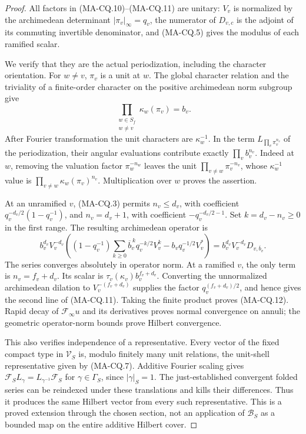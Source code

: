 \begin{proof}
All factors in (MA-CQ.10)--(MA-CQ.11) are unitary:
$V_v$ is normalized by the archimedean determinant
$|\pi_v|_\infty=q_v$, the numerator of $D_{v,c}$
is the adjoint of its commuting invertible
denominator, and (MA-CQ.5) gives the modulus of
each ramified scalar.

We verify that they are the actual periodization,
including the character orientation.
For $w\ne v$, $\pi_v$ is a unit at $w$.
The global character relation and the triviality
of a finite-order character on the positive
archimedean norm subgroup give
\[
                \prod_{\substack{w\in S_f\\w\ne v}}
                              \kappa_w(\pi_v)=b_v .
\tag{MA-CQ.14}
\]
After Fourier transformation the unit characters
are $\kappa_w^{-1}$.
In the term $L_{\prod_v\pi_v^{n_v}}$ of the
periodization, their angular evaluations contribute
exactly $\prod_v b_v^{n_v}$.
Indeed at $w$, removing the valuation factor
$\pi_w^{-n_w}$ leaves the unit
$\prod_{v\ne w}\pi_v^{-n_v}$, whose
$\kappa_w^{-1}$ value is
$\prod_{v\ne w}\kappa_w(\pi_v)^{n_v}$.
Multiplication over $w$ proves the assertion.

At an unramified $v$, (MA-CQ.3) permits
$n_v\le d_v$, with coefficient
$q_v^{-d_v/2}(1-q_v^{-1})$, and $n_v=d_v+1$,
with coefficient $-q_v^{-d_v/2-1}$.
Set $k=d_v-n_v\ge0$ in the first range.
The resulting archimedean operator is
\[
 b_v^{d_v}V_v^{-d_v}
 \left((1-q_v^{-1})
       \sum_{k\ge0}\overline b_v^{\,k}q_v^{-k/2}V_v^k
                   -b_v q_v^{-1/2}V_v^*\right)
       =b_v^{d_v}V_v^{-d_v}D_{v,\overline b_v}.
\tag{MA-CQ.15}
\]
The series converges absolutely in operator norm.
At a ramified $v$, the only term is
$n_v=f_v+d_v$.  Its scalar is
$\tau_v(\kappa_v)b_v^{f_v+d_v}$.
Converting the unnormalized archimedean dilation
to $V_v^{-(f_v+d_v)}$ supplies the factor
$q_v^{(f_v+d_v)/2}$, and hence gives the second
line of (MA-CQ.11).
Taking the finite product proves (MA-CQ.12).
Rapid decay of $\mathcal F_\infty u$ and its
derivatives proves normal convergence on annuli;
the geometric operator-norm bounds prove Hilbert
convergence.

This also verifies independence of a representative.
Every vector of the fixed compact type in
$\mathcal V_S$ is, modulo finitely many unit
relations, the unit-shell representative given
by (MA-CQ.7).
Additive Fourier scaling gives
$\mathcal F_S L_\gamma
       =L_{\gamma^{-1}}\mathcal F_S$
for $\gamma\in\Gamma_S$, since $|\gamma|_S=1$.
The just-established convergent folded series
can be reindexed under these translations and
kills their differences.
Thus it produces the same Hilbert vector from
every such representative.  This is a proved
extension through the chosen section, not an
application of $\mathscr B_S$ as a bounded map
on the entire additive Hilbert cover.


\end{proof}

